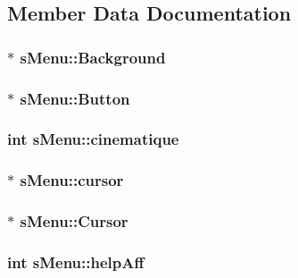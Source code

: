 \subsection{Member Data Documentation}
\hypertarget{structs_menu_a0124a11c88019763ee2a4ce8498ebc5e}{
\subsubsection[{Background}]{$\ast$ s\-Menu\-::\-Background}}\label{structs_menu_a0124a11c88019763ee2a4ce8498ebc5e}
\hypertarget{structs_menu_a203f5f3712aa084f7e411dff36a4dc16}{
\subsubsection[{Button}]{$\ast$ s\-Menu\-::\-Button}}\label{structs_menu_a203f5f3712aa084f7e411dff36a4dc16}
\hypertarget{structs_menu_aa583b6e18415c5f3a650f553a501a192}{
\subsubsection[{cinematique}]{\setlength{\rightskip}{0pt plus 5cm}int s\-Menu\-::cinematique}}\label{structs_menu_aa583b6e18415c5f3a650f553a501a192}
\hypertarget{structs_menu_a85643ef7ac4e03b8d740ae93f03c23d2}{
\subsubsection[{cursor}]{$\ast$ s\-Menu\-::cursor}}\label{structs_menu_a85643ef7ac4e03b8d740ae93f03c23d2}
\hypertarget{structs_menu_adc47799ebb3767570f71ada062542ba1}{
\subsubsection[{Cursor}]{$\ast$ s\-Menu\-::\-Cursor}}\label{structs_menu_adc47799ebb3767570f71ada062542ba1}
\hypertarget{structs_menu_a42f4cbc6bb069bd62e88df596cba100a}{
\subsubsection[{help\-Aff}]{\setlength{\rightskip}{0pt plus 5cm}int s\-Menu\-::help\-Aff}}\label{structs_menu_a42f4cbc6bb069bd62e88df596cba100a}
